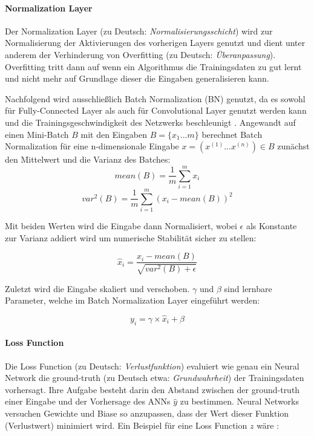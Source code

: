 \paragraph{Normalization Layer}

Der Normalization Layer (zu Deutsch: \textit{Normalisierungsschicht}) wird zur Normalisierung der Aktivierungen des vorherigen Layers genutzt und dient unter anderem der Verhinderung von Overfitting (zu Deutsch: \textit{Überanpassung}). Overfitting tritt dann auf wenn ein Algorithmus die Trainingsdaten zu gut lernt und nicht mehr auf Grundlage dieser die Eingaben generalisieren kann. 

Nachfolgend wird ausschließlich Batch Normalization (BN) genutzt, da es sowohl für Fully-Connected Layer als auch für Convolutional Layer genutzt werden kann und die Trainingsgeschwindigkeit des Netzwerks beschleunigt \parencite{DBLP:conf/icml/IoffeS15}. Angewandt auf einen Mini-Batch $B$ mit den Eingaben $B = \{x_1...m\}$   berechnet Batch Normalization für eine n-dimensionale Eingabe $x = (x^{(1)} ... x^{(n)}) \in B$ zunächst den Mittelwert und die Varianz des Batches: 
\begin{equation}
	mean(B) = \frac{1}{m}\sum_{i=1}^{m} x_i
\end{equation}
\begin{equation}
	var^2(B) = \frac{1}{m}\sum_{i=1}^{m} (x_i - mean(B))^2 
\end{equation}

Mit beiden Werten wird die Eingabe dann Normalisiert, wobei $\epsilon$ als Konstante zur Varianz addiert wird um numerische Stabilität sicher zu stellen:

\begin{equation}
	\hat{x}_i = \frac{x_i - mean(B)}{\sqrt{var^2(B) + \epsilon}}
\end{equation}

Zuletzt wird die Eingabe skaliert und verschoben. $\gamma$ und $\beta$ sind lernbare Parameter, welche im Batch Normalization Layer eingeführt werden: 

\begin{equation}
	y_i = \gamma \times \hat{x}_i + \beta
\end{equation}


\paragraph{Loss Function}

Die Loss Function (zu Deutsch: \textit{Verlustfunktion}) evaluiert wie genau ein Neural Network die ground-truth (zu Deutsch etwa: \textit{Grundwahrheit}) der Trainingsdaten vorhersagt. Ihre Aufgabe besteht darin den Abstand zwischen der ground-truth  einer Eingabe  und der Vorhersage des ANNs $\hat{y}$ zu bestimmen. Neural Networks versuchen Gewichte und Biase so anzupassen, dass der Wert dieser Funktion (Verlustwert) minimiert wird. Ein Beispiel für eine Loss Function $z$ wäre \parencite{Wu.2017}:

